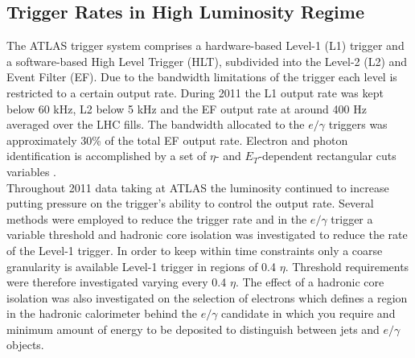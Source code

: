 	\subsection{Trigger Rates in High Luminosity Regime}
		\label{sec:TrigRates}

		The ATLAS trigger system comprises a hardware-based Level-1 (L1) trigger and a software-based High Level Trigger (HLT), subdivided into the Level-2 (L2) and Event Filter (EF). Due to the bandwidth limitations of the trigger each level is restricted to a certain output rate. During 2011 the L1 output rate was kept below 60 kHz, L2 below 5 kHz and the EF output rate at around 400 Hz averaged over the LHC fills. The bandwidth allocated to the $e/\gamma$ triggers was approximately 30\% of the total EF output rate. Electron and photon identification is accomplished by a set of $\eta$- and $E_{T}$-dependent rectangular cuts variables \cite{trig1, trig2}.\\
		Throughout 2011 data taking at ATLAS the luminosity continued to increase putting pressure on the trigger's ability to control the output rate. Several methods were employed to reduce the trigger rate and in the $e/\gamma$ trigger a variable threshold and hadronic core isolation was investigated to reduce the rate of the Level-1 trigger. In order to keep within time constraints only a coarse granularity is available Level-1 trigger in regions of 0.4 $\eta$. Threshold requirements were therefore investigated varying every 0.4 $\eta$. The effect of a hadronic core isolation was also investigated on the selection of electrons which defines a region in the hadronic calorimeter behind the $e/\gamma$ candidate in which you require and minimum amount of energy to be deposited to distinguish between jets and $e/\gamma$ objects. 


